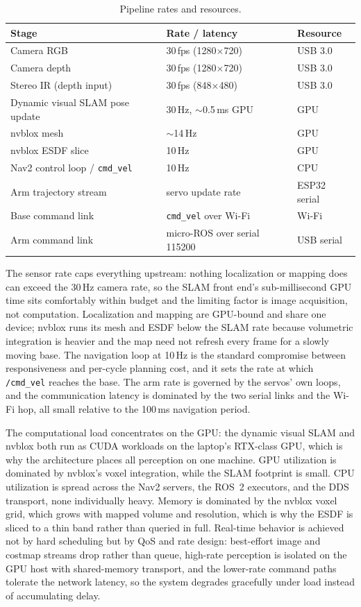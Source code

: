 \begin{table}[H]\centering
\caption{Pipeline rates and resources.}\label{tab:timing}
\small
\begin{tabular}{@{}lll@{}}
\toprule
Stage & Rate / latency & Resource\\\midrule
Camera RGB & 30\,fps (1280$\times$720) & USB 3.0\\
Camera depth & 30\,fps (1280$\times$720) & USB 3.0\\
Stereo IR (depth input) & 30\,fps (848$\times$480) & USB 3.0\\
Dynamic visual SLAM pose update & 30\,Hz, $\sim$0.5\,ms GPU & GPU\\
nvblox mesh & $\sim$14\,Hz & GPU\\
nvblox ESDF slice & 10\,Hz & GPU\\
Nav2 control loop / \texttt{cmd\_vel} & 10\,Hz & CPU\\
Arm trajectory stream & servo update rate & ESP32 serial\\
Base command link & \texttt{cmd\_vel} over Wi-Fi & Wi-Fi\\
Arm command link & micro-ROS over serial 115200 & USB serial\\
\bottomrule
\end{tabular}
\end{table}

The sensor rate caps everything upstream: nothing localization or mapping does can exceed the 30\,Hz camera rate, so the SLAM front end's sub-millisecond GPU time sits comfortably within budget and the limiting factor is image acquisition, not computation. Localization and mapping are GPU-bound and share one device; nvblox runs its mesh and ESDF below the SLAM rate because volumetric integration is heavier and the map need not refresh every frame for a slowly moving base. The navigation loop at 10\,Hz is the standard compromise between responsiveness and per-cycle planning cost, and it sets the rate at which \texttt{/cmd\_vel} reaches the base. The arm rate is governed by the servos' own loops, and the communication latency is dominated by the two serial links and the Wi-Fi hop, all small relative to the 100\,ms navigation period.

The computational load concentrates on the GPU: the dynamic visual SLAM and nvblox both run as CUDA workloads on the laptop's RTX-class GPU, which is why the architecture places all perception on one machine. GPU utilization is dominated by nvblox's voxel integration, while the SLAM footprint is small. CPU utilization is spread across the Nav2 servers, the ROS~2 executors, and the DDS transport, none individually heavy. Memory is dominated by the nvblox voxel grid, which grows with mapped volume and resolution, which is why the ESDF is sliced to a thin band rather than queried in full. Real-time behavior is achieved not by hard scheduling but by QoS and rate design: best-effort image and costmap streams drop rather than queue, high-rate perception is isolated on the GPU host with shared-memory transport, and the lower-rate command paths tolerate the network latency, so the system degrades gracefully under load instead of accumulating delay.

